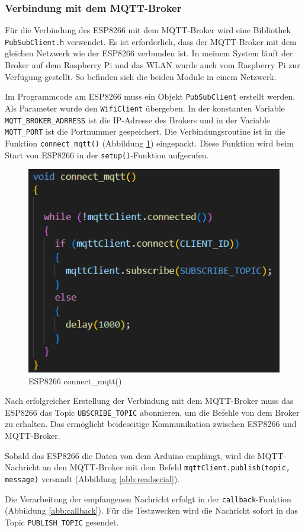 \documentclass[12pt, letterpaper]{article}
\begin{document}
\subsubsection{Verbindung mit dem MQTT-Broker}
\par Für die Verbindung des ESP8266 mit dem MQTT-Broker wird eine Bibliothek \texttt{PubSubClient.h} verwendet. Es ist erforderlich, dass der MQTT-Broker mit dem gleichen Netzwerk wie der ESP8266 verbunden ist. In meinem System läuft der Broker auf dem Raspberry Pi und das WLAN wurde auch vom Raspberry Pi zur Verfügung gestellt. So befinden sich die beiden Module in einem Netzwerk. 
\par Im Programmcode am ESP8266 muss ein Objekt \texttt{PubSubClient} erstellt werden. Als Parameter wurde den \texttt{WifiClient} übergeben. In der konstanten Variable \texttt{MQTT\_BROKER\_ADRRESS} ist die IP-Adresse des Brokers und in der Variable \texttt{MQTT\_PORT} ist die Portnummer gespeichert. Die Verbindungsroutine ist in die Funktion \texttt{connect\_mqtt()} (Abbildung \ref{abb:connect_mqtt}) eingepackt. Diese Funktion wird beim Start von ESP8266 in der \texttt{setup()}-Funktion aufgerufen.
\begin{figure}[h]
  \centering
  \includegraphics[scale=1]{connect_mqtt.png}
  \caption{ESP8266 connect\_mqtt()}
  \label{abb:connect_mqtt}
\end{figure}
\par Nach erfolgreicher Erstellung der Verbindung mit dem MQTT-Broker muss das ESP8266 das Topic \texttt{UBSCRIBE\_TOPIC} abonnieren, um die Befehle von dem Broker zu erhalten. Das ermöglicht beideseitige Kommunikation zwischen ESP8266 und MQTT-Broker.
\par Sobald das ESP8266 die Daten von dem Arduino empfängt, wird die MQTT-Nachricht an den MQTT-Broker mit dem Befehl \texttt{mqttClient.publish(topic, message)} versandt (Abbildung \ref{abb:readserial}).
\par Die Verarbeitung der empfangenen Nachricht erfolgt in der \texttt{callback}-Funktion (Abbildung \ref{abb:callback}). Für die Testzwecken wird die Nachricht sofort in das Topic \texttt{PUBLISH\_TOPIC} gesendet.
\end{document}
